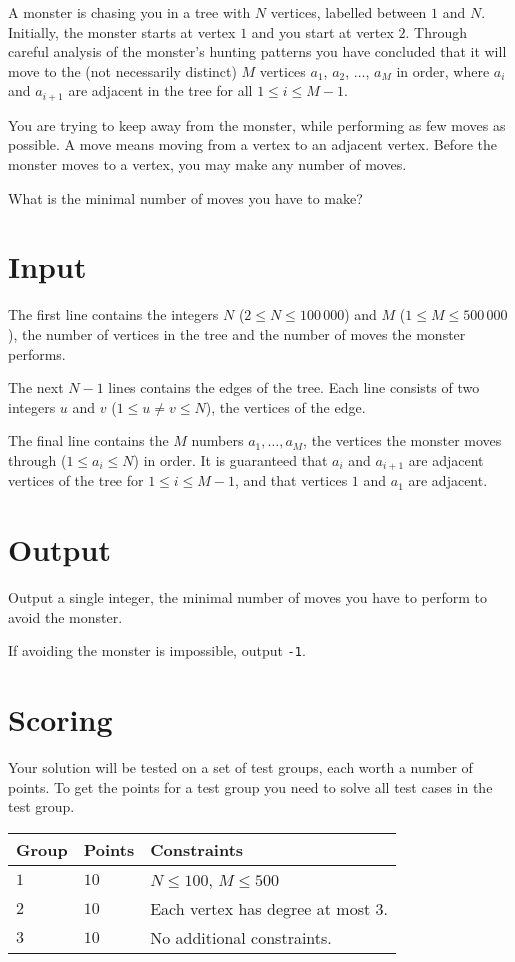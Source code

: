A monster is chasing you in a tree with $N$ vertices, labelled between $1$ and $N$.
Initially, the monster starts at vertex $1$ and you start at vertex $2$.
Through careful analysis of the monster's hunting patterns you have concluded that it will move to the (not necessarily distinct) $M$ vertices $a_1$, $a_2$, $\dots$, $a_M$ in order, where $a_i$ and $a_{i+1}$ are adjacent in the tree for all $1 \le i \le M - 1$.

You are trying to keep away from the monster, while performing as few moves as possible.
A move means moving from a vertex to an adjacent vertex.
Before the monster moves to a vertex, you may make any number of moves.

What is the minimal number of moves you have to make?

\section*{Input}
The first line contains the integers $N$ ($2 \le N \le 100\,000$) and $M$ ($1 \le M \le 500\,000$), the number of vertices in the tree and the number of moves the monster performs.

The next $N-1$ lines contains the edges of the tree.
Each line consists of two integers $u$ and $v$ ($1 \le u \neq v \le N$), the vertices of the edge.

The final line contains the $M$ numbers $a_1, \dots, a_M$, the vertices the monster moves through ($1 \le a_i \le N$) in order.
It is guaranteed that $a_i$ and $a_{i+1}$ are adjacent vertices of the tree for $1 \le i \le M-1$, and that vertices $1$ and $a_1$ are adjacent.

\section*{Output}
Output a single integer, the minimal number of moves you have to perform to avoid the monster.

If avoiding the monster is impossible, output \texttt{-1}.

\section*{Scoring}
Your solution will be tested on a set of test groups, each worth a number of points.
To get the points for a test group you need to solve all test cases in the test group.

\noindent
\begin{tabular}{| l | l | p{10cm} |}
  \hline
  Group & Points & Constraints \\ \hline
  $1$   & $10$   & $N \le 100$, $M \le 500$ \\ \hline
  $2$   & $10$   & Each vertex has degree at most $3$. \\ \hline
  $3$   & $10$   & No additional constraints. \\ \hline
\end{tabular}
